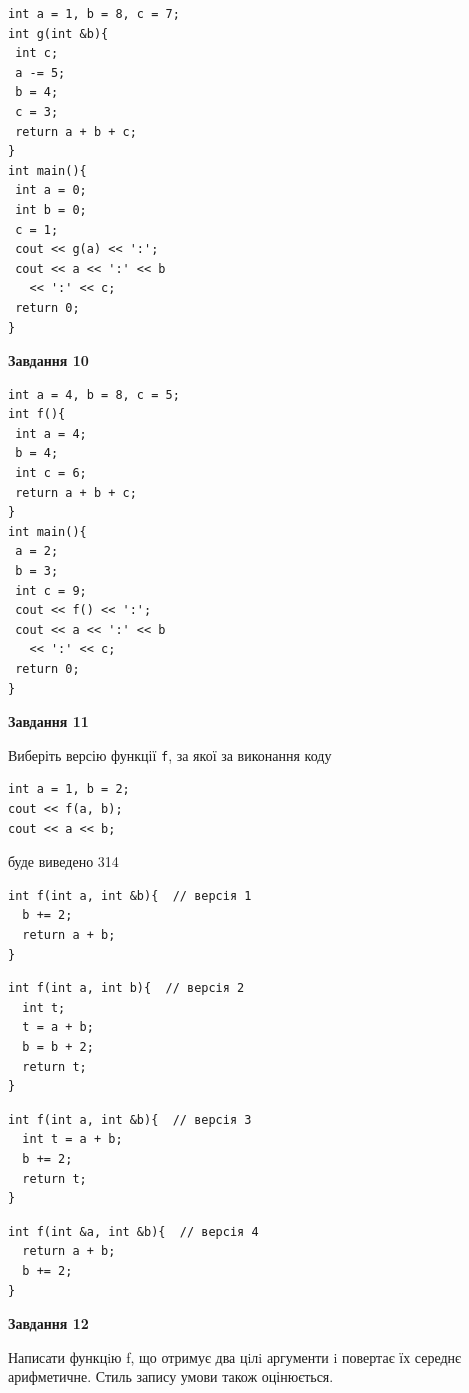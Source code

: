 \documentclass[12pt, ukrainian]{article}
\def\code#1{\Verb!#1!}
\begin{document}
{\begin {large}
\begin{minipage}[t]{7.0cm}
\begin{verbatim}
int a = 1, b = 8, c = 7;
int g(int &b){
 int c;
 a -= 5;
 b = 4;
 c = 3;
 return a + b + c;
}
int main(){
 int a = 0;
 int b = 0;
 c = 1;
 cout << g(a) << ':';
 cout << a << ':' << b 
   << ':' << c;
 return 0;
}
\end{verbatim}



\begin{center}
\textbf{Завдання 10}
\end{center}
\vspace{-8mm}

\begin{verbatim}
int a = 4, b = 8, c = 5;
int f(){
 int a = 4;
 b = 4;
 int c = 6;
 return a + b + c;
}
int main(){
 a = 2;
 b = 3;
 int c = 9;
 cout << f() << ':';
 cout << a << ':' << b 
   << ':' << c;
 return 0;
}
\end{verbatim}

\end{minipage}
\vline \hspace{1mm}
\begin{minipage}[t]{11.0cm}

\begin{center}
\textbf{Завдання 11}
\end{center}
Виберіть версію функції \code{f}, за якої за виконання коду
\begin{verbatim}
int a = 1, b = 2;
cout << f(a, b);
cout << a << b;
\end{verbatim}

буде виведено 314

\begin{verbatim}
int f(int a, int &b){  // версія 1
  b += 2;
  return a + b;
}
\end{verbatim}

\vspace{-8mm}\begin{verbatim}
int f(int a, int b){  // версія 2
  int t;
  t = a + b;
  b = b + 2;
  return t;
}
\end{verbatim}

\vspace{-8mm}\begin{verbatim}
int f(int a, int &b){  // версія 3
  int t = a + b;
  b += 2;
  return t;
}
\end{verbatim}

\vspace{-8mm}\begin{verbatim}
int f(int &a, int &b){  // версія 4
  return a + b;
  b += 2;
}
\end{verbatim}



\begin{center}
\textbf{Завдання 12}
\end{center}

Написати функцiю f, що отримує два цiлi аргументи i повертає їх середнє арифметичне. Стиль запису умови також оцінюється.\par

\end{minipage}

\end {large}}
\newpage
\end{document}
